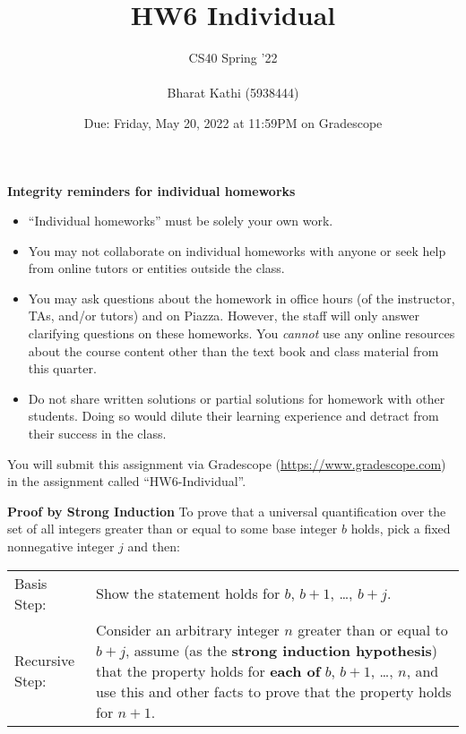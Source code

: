 \documentclass[12pt, oneside]{article}
\title{HW6 Individual}
\author{CS40 Spring '22\\\\
Bharat Kathi (5938444)}
\date{Due: Friday, May 20, 2022 at 11:59PM on Gradescope}
\begin{document}
    \maketitle

    {\bf Integrity reminders for individual homeworks}
    \begin{itemize}
        \item ``Individual homeworks'' must be solely your own work. 
        \item You may not collaborate on individual homeworks with anyone or seek help from online tutors or entities outside the class.
        \item You may ask questions about the homework in office hours (of the instructor, TAs, and/or tutors) and 
        on Piazza.  However, the staff will only answer clarifying questions on these homeworks. You \emph{cannot} use any online resources about the course content other than the text
        book and class material from this quarter.
        \item Do not share written solutions or partial solutions for homework with other students. Doing so would dilute their learning experience and detract from their success in the class.
    \end{itemize}

    You will submit this assignment via Gradescope (\href{https://www.gradescope.com}{https://www.gradescope.com}) in the assignment called ``HW6-Individual''.
    
    {\bf Proof by Strong Induction} To prove that a universal quantification over the set of all integers greater than or equal to some  base integer $b$ holds,  pick a  fixed nonnegative integer  $j$ and then: \hfill 

    \begin{tabularx}{\textwidth}{l X}
        Basis Step: & Show the statement holds for $b$, $b+1$, \ldots, $b+j$. \\
        Recursive Step: & Consider an arbitrary integer $n$ greater than or  equal to  $b+j$, assume
        (as the {\bf strong  induction hypothesis})  that the property holds  for {\bf each of} $b$, $b+1$, \ldots, $n$, 	
        and use  this and
        other facts to  prove that  the property holds for $n+1$.
    \end{tabularx}

\newpage
\end{document}
